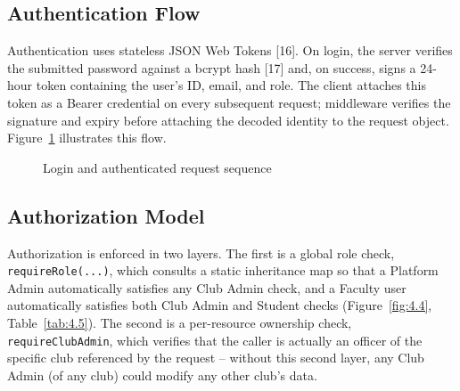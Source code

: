\documentclass[12pt,oneside]{book}
\begin{document}
\subsection{Authentication Flow}
Authentication uses stateless JSON Web Tokens [16]. On login, the server verifies the submitted password against a bcrypt hash [17] and, on success, signs a 24-hour token containing the user's ID, email, and role. The client attaches this token as a Bearer credential on every subsequent request; middleware verifies the signature and expiry before attaching the decoded identity to the request object. Figure~\ref{fig:4.3} illustrates this flow.

\begin{figure}[H]
\centering
{}
\caption{Login and authenticated request sequence}
\label{fig:4.3}
\end{figure}

\subsection{Authorization Model}
Authorization is enforced in two layers. The first is a global role check, \texttt{requireRole(...)}, which consults a static inheritance map so that a Platform Admin automatically satisfies any Club Admin check, and a Faculty user automatically satisfies both Club Admin and Student checks (Figure~\ref{fig:4.4}, Table~\ref{tab:4.5}). The second is a per-resource ownership check, \texttt{requireClubAdmin}, which verifies that the caller is actually an officer of the specific club referenced by the request -- without this second layer, any Club Admin (of any club) could modify any other club's data.
\end{document}
